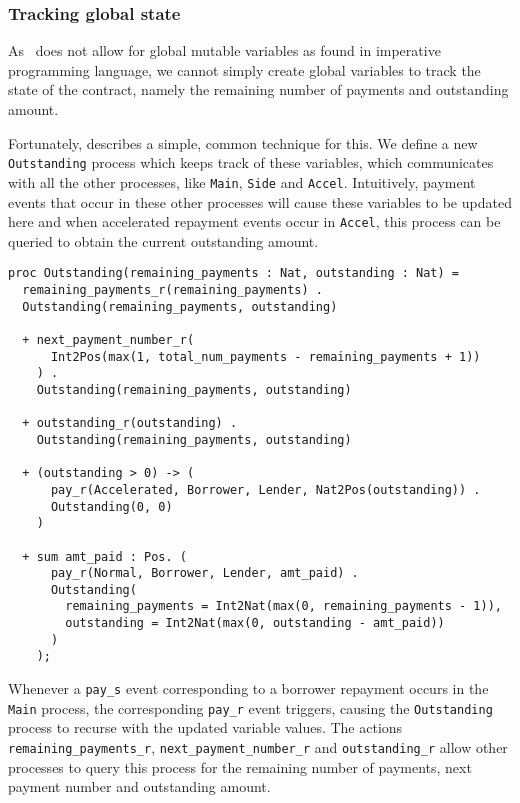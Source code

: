 \documentclass{article}
\begin{document}
\subsubsection{Tracking global state}

As \mcrl \, does not allow for global mutable variables as found in
imperative programming language, we cannot simply create global variables to
track the state of the contract, namely the remaining number of payments and
outstanding amount.

Fortunately, \cite[Section 3.2.2]{mcrl_lhc} describes a simple, common
technique for this.
We define a new \texttt{Outstanding} process which keeps track of these
variables, which communicates with all the other processes, like
\texttt{Main}, \texttt{Side} and \texttt{Accel}.
Intuitively, payment events that occur in these other processes will cause
these variables to be updated here and when accelerated repayment events
occur in \texttt{Accel}, this process can be queried to obtain the current
outstanding amount.

\begin{lstlisting}
proc Outstanding(remaining_payments : Nat, outstanding : Nat) =
  remaining_payments_r(remaining_payments) .
  Outstanding(remaining_payments, outstanding)

  + next_payment_number_r(
      Int2Pos(max(1, total_num_payments - remaining_payments + 1))
    ) .
    Outstanding(remaining_payments, outstanding)

  + outstanding_r(outstanding) .
    Outstanding(remaining_payments, outstanding)

  + (outstanding > 0) -> (
      pay_r(Accelerated, Borrower, Lender, Nat2Pos(outstanding)) .
      Outstanding(0, 0)
    )

  + sum amt_paid : Pos. (
      pay_r(Normal, Borrower, Lender, amt_paid) .
      Outstanding(
        remaining_payments = Int2Nat(max(0, remaining_payments - 1)),
        outstanding = Int2Nat(max(0, outstanding - amt_paid))
      )
    );
\end{lstlisting}

Whenever a \texttt{pay\_s} event corresponding to a borrower repayment occurs
in the \texttt{Main} process,
the corresponding \texttt{pay\_r} event triggers, causing the
\texttt{Outstanding} process to recurse with the updated variable values.
The actions \texttt{remaining\_payments\_r}, \texttt{next\_payment\_number\_r}
and \texttt{outstanding\_r} allow other processes to query this process for
the remaining number of payments, next payment number and outstanding amount.
\end{document}
